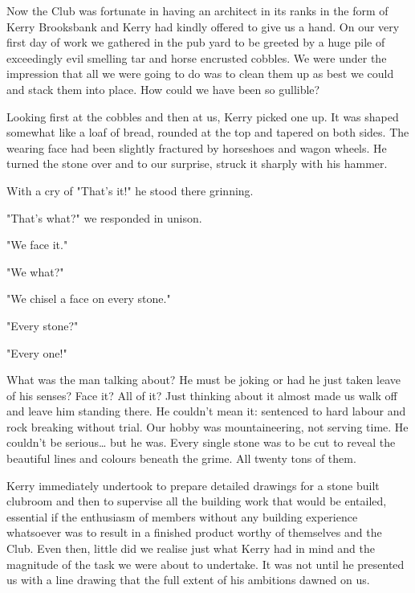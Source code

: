 \documentclass[a5paper,openany,font 10pt]{scrbook}
\begin{document}
Now the Club was fortunate in having an architect in its
ranks in the form of Kerry Brooksbank and Kerry had kindly
offered to give us a hand. On our very first day of work we
gathered in the pub yard to be greeted by a huge pile of
exceedingly evil smelling tar and horse encrusted cobbles. We
were under the impression that all we were going to do was to
clean them up as best we could and stack them into place. How
could we have been so gullible?

Looking first at the cobbles and then at us, Kerry picked
one up. It was shaped somewhat like a loaf of bread, rounded at
the top and tapered on both sides. The wearing face had been
slightly fractured by horseshoes and wagon wheels. He turned the
stone over and to our surprise, struck it sharply with his
hammer.

With a cry of "That's it!" he stood there grinning.

"That's what?" we responded in unison.

"We face it."

"We what?"

"We chisel a face on every stone."

"Every stone?"

"Every one!"

What was the man talking about? He must be joking  or had he
just taken leave of his senses? Face it? All of it? Just thinking
about it almost made us walk off and leave him standing there. He
couldn't mean it: sentenced to hard labour and rock breaking
without trial. Our hobby was mountaineering, not serving time. He
couldn't be serious\ldots{} but he was. Every single stone was to be
cut to reveal the beautiful lines and colours beneath the grime.
All twenty tons of them.

Kerry immediately undertook to prepare detailed drawings for
a stone built clubroom and then to supervise all the building
work that would be entailed, essential if the enthusiasm of
members without any building experience whatsoever was to result
in a finished product worthy of themselves and the Club. Even
then, little did we realise just what Kerry had in mind and the
magnitude of the task we were about to undertake. It was not
until he presented us with a line drawing that the full extent of
his ambitions dawned on us.
\end{document}
